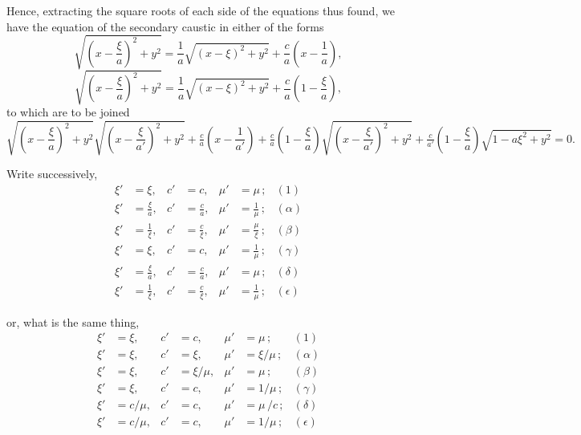 \documentclass[11pt,a4paper]{book}
\begin{document}
\medskip

Hence, extracting the square roots of each side of the equations thus found, we
have the equation of the secondary caustic in either of the forms
\[
\sqrt{\left(x-\frac{\xi}{a}\right)^2+y^2}=\frac{1}{a}\sqrt{(x-\xi)^2+y^2}+\frac{c}{a}\left(x-\frac{1}{a}\right),
\]
\[
\sqrt{\left(x-\frac{\xi}{a}\right)^2+y^2}=\frac{1}{a}\sqrt{(x-\xi)^2+y^2}+\frac{c}{a}\left(1-\frac{\xi}{a}\right),
\]
to which are to be joined
\[
\sqrt{\left(x-\frac{\xi}{a}\right)^2+y^2}\sqrt{\left(x-\frac{\xi}{a'}\right)^2+y^2}+\tfrac{c}{a}\left(x-\frac{1}{a'}\right)
+ \tfrac{c}{a}\left(1-\frac{\xi}{a}\right)\sqrt{\left(x-\frac{\xi}{a'}\right)^2+y^2}+\tfrac{c}{a'}\left(1-\frac{\xi}{a}\right)\sqrt{1-a\xi^2+y^2}=0.
\]

\medskip

Write successively,
\begin{align*}
\xi' &= \xi, & c' &= c, & \mu' &= \mu \,; & (1) \\
\xi' &= \frac{\xi}{a}, & c' &= \frac{c}{a}, & \mu' &= \frac{1}{\mu} \,; & (\alpha) \\
\xi' &= \frac{1}{\xi}, & c' &= \frac{c}{\xi}, & \mu' &= \frac{\mu}{\xi} \,; & (\beta) \\
\xi' &= \xi, & c' &= c, & \mu' &= \frac{1}{\mu} \,; & (\gamma) \\
\xi' &= \frac{\xi}{a}, & c' &= \frac{c}{a}, & \mu' &= \mu \,; & (\delta) \\
\xi' &= \frac{1}{\xi}, & c' &= \frac{c}{\xi}, & \mu' &= \frac{1}{\mu} \,; & (\epsilon)
\end{align*}

\medskip

or, what is the same thing,
\begin{align*}
\xi' &= \xi, & c' &= c, & \mu' &= \mu \,; & (1) \\
\xi' &= \xi, & c' &= \xi, & \mu' &= \xi/\mu \,; & (\alpha) \\
\xi' &= \xi, & c' &= \xi/\mu, & \mu' &= \mu \,; & (\beta) \\
\xi' &= \xi, & c' &= c, & \mu' &= 1/\mu \,; & (\gamma) \\
\xi' &= c/\mu, & c' &= c, & \mu' &= \mu\,/c \,; & (\delta) \\
\xi' &= c/\mu, & c' &= c, & \mu' &= 1/\mu \,; & (\epsilon)
\end{align*}

\medskip
\end{document}
